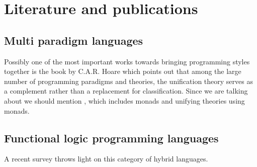 \documentclass[thesis-solanki.tex]{subfiles}
\begin{document}


\section{Literature and publications}
\subsection{Multi paradigm languages}
Possibly one of the most important works towards bringing programming styles together is the book
\cite{hoare1998unifying} by C.A.R.
Hoare which points out that among the large number of programming paradigms and theories, the unification theory
serves as a complement rather than a replacement for classification.
Since we are talking about  we should mention \cite{gibbons2013unifying}, which includes monads
and unifying theories using monads.
 

\subsection{Functional logic programming languages}

A recent survey \cite{hanus2007multi} throws light on this category of hybrid languages. 
\end{document}
